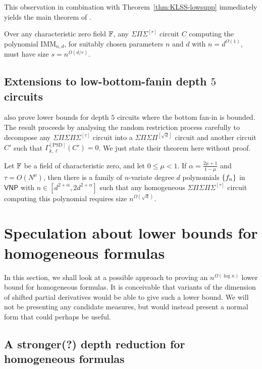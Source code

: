 \documentclass[12pt]{report}
\newcommand{\SPS}{\Sigma\Pi\Sigma}
\newcommand{\IMM}{\mathrm{IMM}}
\newcommand{\VNP}{\mathsf{VNP}}
\begin{document}
This observation in combination with Theorem~\ref{thm:KLSS-lowsupp} immediately yields the main theorem of \cite{KayalSaha14}. 

\begin{theorem}\label{thm:kaysaha-main}
Over any characteristic zero field $\mathbb{F}$, any $\SPS^{[r]}$ circuit $C$ computing the polynomial $\IMM_{n,d}$, for suitably chosen parameters $n$ and $d$ with $n = d^{O(1)}$, must have size $s = n^{\Omega(d/r)}$. 
\end{theorem}

\subsection{Extensions to low-bottom-fanin depth $5$ circuits}

\cite{KayalSaha14} also prove lower bounds for depth $5$ circuits where the bottom fan-in is bounded. The result proceeds by analysing the random restriction process carefully to decompose any $\Sigma\Pi\Sigma\Pi\Sigma^{[\tau]}$ circuit into a $\Sigma\Pi\Sigma\Pi^{[\sqrt{d}]}$ circuit and another circuit $C'$ such that $\Gamma_{k,\ell}^{[\mathrm{PSD}]}(C') = 0$. We just state their theorem here without proof. 

\begin{theorem}\label{thm:kaysaha-d5}
Let $\mathbb{F}$ be a field of characteristic zero, and let $0\leq \mu < 1$. If $\alpha  = \frac{2\mu + 1}{1 - \mu}$ and $\tau = O(N^\mu)$, then there is a family of $n$-variate degree $d$ polynomials $\left\{f_n\right\}$ in $\VNP$ with $n\in [d^{2+\alpha}, 2d^{2+\alpha}]$ such that any homogeneous $\Sigma\Pi\Sigma\Pi\Sigma^{[\tau]}$ circuit computing this polynomial requires size $n^{\Omega(\sqrt{d})}$. 
\end{theorem}

\section{Speculation about lower bounds for homogeneous formulas}\label{sec:hom-formulas}

In this section, we shall look at a possible approach to proving an $n^{\Omega(\log n)}$ lower bound for homogeneous formulas. It is conceivable that variants of the dimension of shifted partial derivatives would be able to give such a lower bound. We will not be presenting any candidate measures, but would instead present a normal form that could perhaps be useful. 

\subsection{A stronger(?) depth reduction for homogeneous formulas}
\end{document}

